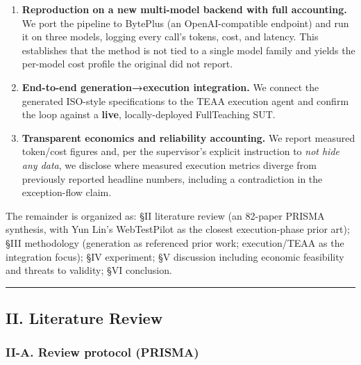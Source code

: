\documentclass[
]{article}
\providecommand{\tightlist}{%
  \setlength{\itemsep}{0pt}\setlength{\parskip}{0pt}}
\begin{document}
\begin{enumerate}
\def\labelenumi{\arabic{enumi}.}
\tightlist
\item
  \textbf{Reproduction on a new multi-model backend with full
  accounting.} We port the pipeline to BytePlus (an OpenAI-compatible
  endpoint) and run it on three models, logging every call's tokens,
  cost, and latency. This establishes that the method is not tied to a
  single model family and yields the per-model cost profile the original
  did not report.
\item
  \textbf{End-to-end generation→execution integration.} We connect the
  generated ISO-style specifications to the TEAA execution agent and
  confirm the loop against a \textbf{live}, locally-deployed
  FullTeaching SUT.
\item
  \textbf{Transparent economics and reliability accounting.} We report
  measured token/cost figures and, per the supervisor's explicit
  instruction to \emph{not hide any data}, we disclose where measured
  execution metrics diverge from previously reported headline numbers,
  including a contradiction in the exception-flow claim.
\end{enumerate}

The remainder is organized as: §II literature review (an 82-paper PRISMA
synthesis, with Yun Lin's WebTestPilot as the closest execution-phase
prior art); §III methodology (generation as referenced prior work;
execution/TEAA as the integration focus); §IV experiment; §V discussion
including economic feasibility and threats to validity; §VI conclusion.

\begin{center}\rule{0.5\linewidth}{0.5pt}\end{center}

\subsection{II. Literature Review}\label{ii.-literature-review}

\subsubsection{II-A. Review protocol
(PRISMA)}\label{ii-a.-review-protocol-prisma}
\end{document}
